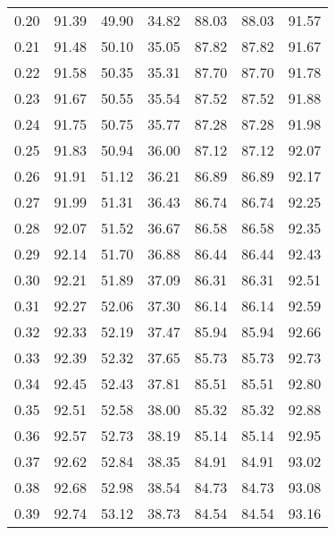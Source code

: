 \begin{tabular}{|c|c|c|c|c|c|c|}
      0.20 &     91.39 &     49.90 &      34.82 &   88.03 &      88.03 &         91.57 \\
      0.21 &     91.48 &     50.10 &      35.05 &   87.82 &      87.82 &         91.67 \\
      0.22 &     91.58 &     50.35 &      35.31 &   87.70 &      87.70 &         91.78 \\
      0.23 &     91.67 &     50.55 &      35.54 &   87.52 &      87.52 &         91.88 \\
      0.24 &     91.75 &     50.75 &      35.77 &   87.28 &      87.28 &         91.98 \\
      0.25 &     91.83 &     50.94 &      36.00 &   87.12 &      87.12 &         92.07 \\
      0.26 &     91.91 &     51.12 &      36.21 &   86.89 &      86.89 &         92.17 \\
      0.27 &     91.99 &     51.31 &      36.43 &   86.74 &      86.74 &         92.25 \\
      0.28 &     92.07 &     51.52 &      36.67 &   86.58 &      86.58 &         92.35 \\
      0.29 &     92.14 &     51.70 &      36.88 &   86.44 &      86.44 &         92.43 \\
      0.30 &     92.21 &     51.89 &      37.09 &   86.31 &      86.31 &         92.51 \\
      0.31 &     92.27 &     52.06 &      37.30 &   86.14 &      86.14 &         92.59 \\
      0.32 &     92.33 &     52.19 &      37.47 &   85.94 &      85.94 &         92.66 \\
      0.33 &     92.39 &     52.32 &      37.65 &   85.73 &      85.73 &         92.73 \\
      0.34 &     92.45 &     52.43 &      37.81 &   85.51 &      85.51 &         92.80 \\
      0.35 &     92.51 &     52.58 &      38.00 &   85.32 &      85.32 &         92.88 \\
      0.36 &     92.57 &     52.73 &      38.19 &   85.14 &      85.14 &         92.95 \\
      0.37 &     92.62 &     52.84 &      38.35 &   84.91 &      84.91 &         93.02 \\
      0.38 &     92.68 &     52.98 &      38.54 &   84.73 &      84.73 &         93.08 \\
      0.39 &     92.74 &     53.12 &      38.73 &   84.54 &      84.54 &         93.16 \\

\end{tabular}
